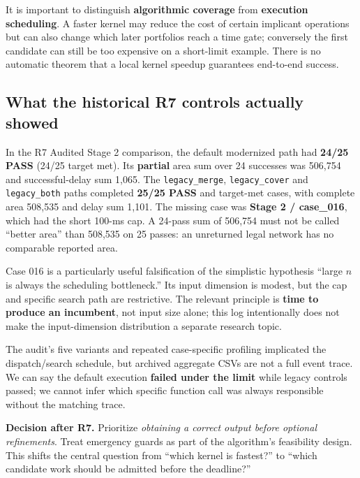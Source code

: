 It is important to distinguish \textbf{algorithmic coverage} from \textbf{execution scheduling}. A faster kernel may reduce the cost of certain implicant operations but can also change which later portfolios reach a time gate; conversely the first candidate can still be too expensive on a short-limit example. There is no automatic theorem that a local kernel speedup guarantees end-to-end success.

\subsection{What the historical R7 controls actually showed}\label{what-the-historical-r7-controls-actually-showed}

In the R7 Audited Stage 2 comparison, the default modernized path had \textbf{24/25 PASS} (24/25 target met). Its \textbf{partial} area sum over 24 successes was 506,754 and successful-delay sum 1,065. The \texttt{legacy\_merge}, \texttt{legacy\_cover} and \texttt{legacy\_both} paths completed \textbf{25/25 PASS} and target-met cases, with complete area 508,535 and delay sum 1,101. The missing case was \textbf{Stage 2 / case\_016}, which had the short 100-ms cap. A 24-pass sum of 506,754 must not be called ``better area'' than 508,535 on 25 passes: an unreturned legal network has no comparable reported area.

Case 016 is a particularly useful falsification of the simplistic hypothesis ``large \(n\) is always the scheduling bottleneck.'' Its input dimension is modest, but the cap and specific search path are restrictive. The relevant principle is \textbf{time to produce an incumbent}, not input size alone; this log intentionally does not make the input-dimension distribution a separate research topic.

The audit's five variants and repeated case-specific profiling implicated the dispatch/search schedule, but archived aggregate CSVs are not a full event trace. We can say the default execution \textbf{failed under the limit} while legacy controls passed; we cannot infer which specific function call was always responsible without the matching trace.

\begin{tcolorbox}[colback=ResearchBlue!6!white,colframe=ResearchSlate!55!white,boxrule=0.65pt,arc=1mm,breakable]
\textbf{Decision after R7.} Prioritize \emph{obtaining a correct output before optional refinements}. Treat emergency guards as part of the algorithm's feasibility design. This shifts the central question from ``which kernel is fastest?'' to ``which candidate work should be admitted before the deadline?''
\end{tcolorbox}

